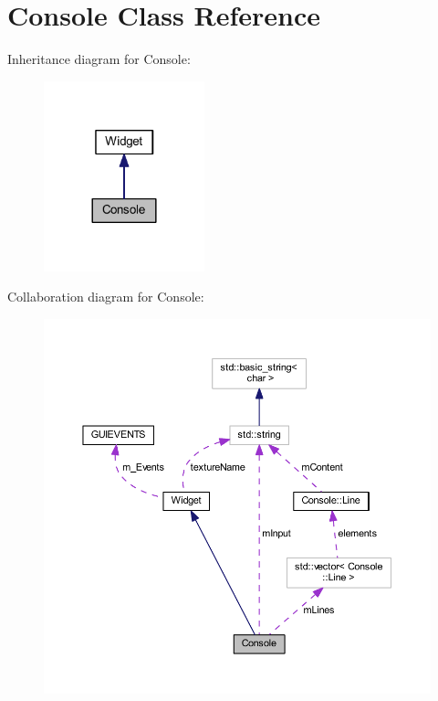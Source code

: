 \hypertarget{class_console}{}\section{Console Class Reference}
\label{class_console}


Inheritance diagram for Console\+:
\nopagebreak
\begin{figure}[H]
\begin{center}
\leavevmode
\includegraphics[width=132pt]{class_console__inherit__graph}
\end{center}
\end{figure}


Collaboration diagram for Console\+:
\nopagebreak
\begin{figure}[H]
\begin{center}
\leavevmode
\includegraphics[width=350pt]{class_console__coll__graph}
\end{center}
\end{figure}
